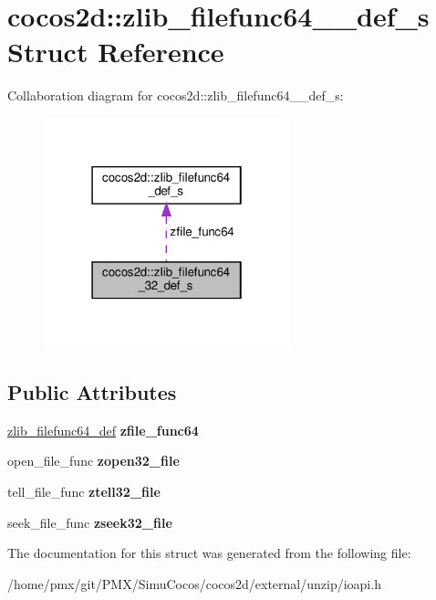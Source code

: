 \hypertarget{structcocos2d_1_1zlib__filefunc64__32__def__s}{}\section{cocos2d\+:\+:zlib\+\_\+filefunc64\+\_\+\_\+def\+\_\+s Struct Reference}
\label{structcocos2d_1_1zlib__filefunc64__32__def__s}


Collaboration diagram for cocos2d\+:\+:zlib\+\_\+filefunc64\+\_\+\_\+def\+\_\+s\+:
\nopagebreak
\begin{figure}[H]
\begin{center}
\leavevmode
\includegraphics[width=202pt]{structcocos2d_1_1zlib__filefunc64__32__def__s__coll__graph}
\end{center}
\end{figure}
\subsection*{Public Attributes}
\begin{DoxyCompactItemize}
\item 
\mbox{\label{structcocos2d_1_1zlib__filefunc64__32__def__s_a2ff222d165f2b94f6f791817799d88fa}} 
\hyperlink{structcocos2d_1_1zlib__filefunc64__def__s}{zlib\+\_\+filefunc64\+\_\+def} {\bfseries zfile\+\_\+func64}
\item 
\mbox{\label{structcocos2d_1_1zlib__filefunc64__32__def__s_a2384af168de4f5bb6b6e220ca493c29b}} 
open\+\_\+file\+\_\+func {\bfseries zopen32\+\_\+file}
\item 
\mbox{\label{structcocos2d_1_1zlib__filefunc64__32__def__s_a53df48747e3c5a10b6bd44cff6dc0e35}} 
tell\+\_\+file\+\_\+func {\bfseries ztell32\+\_\+file}
\item 
\mbox{\label{structcocos2d_1_1zlib__filefunc64__32__def__s_a5f790b056d8e71e25c0a14b6ca2c7c43}} 
seek\+\_\+file\+\_\+func {\bfseries zseek32\+\_\+file}
\end{DoxyCompactItemize}


The documentation for this struct was generated from the following file\+:\begin{DoxyCompactItemize}
\item 
/home/pmx/git/\+P\+M\+X/\+Simu\+Cocos/cocos2d/external/unzip/ioapi.\+h\end{DoxyCompactItemize}
